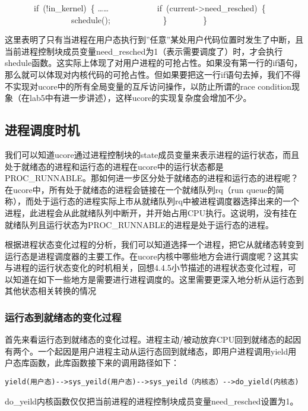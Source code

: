 ~~~~~~~if~(!in\_kernel)~\{ \ldots{}\ldots{}
~~~~~~~~~~~if~(current-\textgreater{}need\_resched)~\{
~~~~~~~~~~~~~~~~schedule(); ~~~~~~~~~~~~\} ~~~~~~~~\}

这里表明了只有当进程在用户态执行到''任意''某处用户代码位置时发生了中断，且当前进程控制块成员变量need\_resched为1（表示需要调度了）时，才会执行shedule函数。这实际上体现了对用户进程的可抢占性。如果没有第一行的if语句，那么就可以体现对内核代码的可抢占性。但如果要把这一行if语句去掉，我们不得不实现对ucore中的所有全局变量的互斥访问操作，以防止所谓的race
condition现象（在lab5中有进一步讲述），这样ucore的实现复杂度会增加不少。

\subsection{进程调度时机}\label{ux8fdbux7a0bux8c03ux5ea6ux65f6ux673a}

我们可以知道ucore通过进程控制块的state成员变量来表示进程的运行状态，而且处于就绪态的进程和运行态的进程在ucore中的运行状态都是PROC\_RUNNABLE。那如何进一步区分处于就绪态的进程和运行态的进程呢？在ucore中，所有处于就绪态的进程会链接在一个就绪队列rq（run
queue的简称），而处于运行态的进程实际上市从就绪队列rq中被进程调度器选择出来的一个进程，此进程会从此就绪队列中断开，并开始占用CPU执行。这说明，没有挂在就绪队列且运行状态为PROC\_RUNNABLE的进程是处于运行态的进程。

根据进程状态变化过程的分析，我们可以知道选择一个进程，把它从就绪态转变到运行态是进程调度器的主要工作。在ucore内核中哪些地方会进行调度呢？这其实与进程的运行状态变化的时机相关，回想4.4.5小节描述的进程状态变化过程，可以知道在如下一些地方是需要进行进程调度的。这里需要更深入地分析从运行态到其他状态相关转换的情况

\subsubsection{运行态到就绪态的变化过程}\label{ux8fd0ux884cux6001ux5230ux5c31ux7eeaux6001ux7684ux53d8ux5316ux8fc7ux7a0b}

首先来看运行态到就绪态的变化过程。进程主动/被动放弃CPU回到就绪态的起因有两个。一个起因是用户进程主动从运行态回到就绪态，即用户进程调用yield用户态库函数，此库函数接下来的调用路径如下：

\begin{lstlisting}
yield(用户态)-->sys_yeild(用户态)-->sys_yeild（内核态）-->do_yield(内核态)
\end{lstlisting}

do\_yeild内核函数仅仅把当前进程的进程控制块成员变量need\_resched设置为1。

